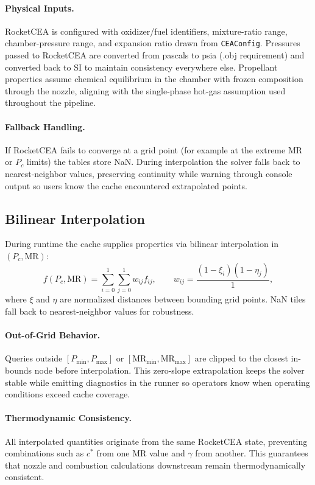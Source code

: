 \documentclass[12pt]{article}
\begin{document}
\paragraph{Physical Inputs.}  RocketCEA is configured with oxidizer/fuel identifiers, mixture-ratio range, chamber-pressure range, and expansion ratio drawn from \verb|CEAConfig|.  Pressures passed to RocketCEA are converted from pascals to psia (.obj requirement) and converted back to SI to maintain consistency everywhere else.  Propellant properties assume chemical equilibrium in the chamber with frozen composition through the nozzle, aligning with the single-phase hot-gas assumption used throughout the pipeline.

\paragraph{Fallback Handling.}  If RocketCEA fails to converge at a grid point (for example at the extreme MR or $P_c$ limits) the tables store NaN.  During interpolation the solver falls back to nearest-neighbor values, preserving continuity while warning through console output so users know the cache encountered extrapolated points.

\subsection{Bilinear Interpolation}
During runtime the cache supplies properties via bilinear interpolation in $(P_c, \text{MR})$:
\[
f(P_c, \text{MR}) = \sum_{i=0}^1\sum_{j=0}^1 w_{ij} f_{ij}, \qquad w_{ij} = \frac{(1 - \xi_i)(1 - \eta_j)}{1},
\]
where $\xi$ and $\eta$ are normalized distances between bounding grid points.  NaN tiles fall back to nearest-neighbor values for robustness.

\paragraph{Out-of-Grid Behavior.}  Queries outside $[P_{\min}, P_{\max}]$ or $[\text{MR}_{\min}, \text{MR}_{\max}]$ are clipped to the closest in-bounds node before interpolation.  This zero-slope extrapolation keeps the solver stable while emitting diagnostics in the runner so operators know when operating conditions exceed cache coverage.

\paragraph{Thermodynamic Consistency.}  All interpolated quantities originate from the same RocketCEA state, preventing combinations such as $c^*$ from one MR value and $\gamma$ from another.  This guarantees that nozzle and combustion calculations downstream remain thermodynamically consistent.
\end{document}
